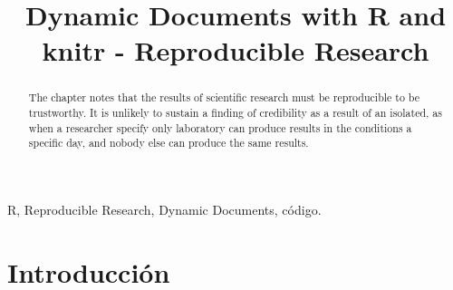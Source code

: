 \documentclass[conference]{IEEEtran}
\begin{document}
\title{Dynamic Documents with R and knitr - Reproducible Research
}


\author{


}


\maketitle

\begin{abstract}
The chapter notes that the results of scientific research must be reproducible to be trustworthy. It is unlikely to sustain a finding of credibility as a result of an isolated, as when a researcher specify only laboratory can produce results in the conditions a specific day, and nobody else can produce the same results.
\end{abstract}


\begin{IEEEkeywords}
R, Reproducible Research, Dynamic Documents, código.
\end{IEEEkeywords}


\section{Introducción}
\end{document}

